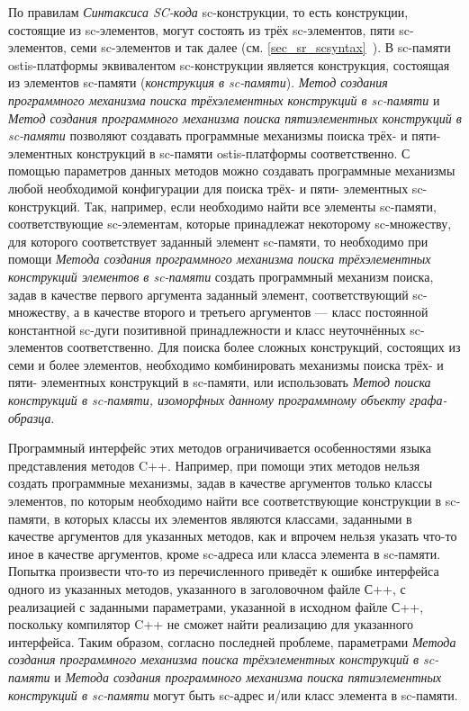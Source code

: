 По правилам \textit{Синтаксиса SC-кода} sc-конструкции, то есть конструкции, состоящие из sc-элементов, могут состоять из трёх sc-элементов, пяти sc-элементов, семи sc-элементов и так далее (см. \ref{sec_sr_scsyntax}~). В sc-памяти ostis-платформы эквивалентом sc-конструкции является конструкция, состоящая из элементов sc-памяти (\textit{конструкция в sc-памяти}). \textit{Метод создания программного механизма поиска трёхэлементных конструкций в sc-памяти} и \textit{Метод создания программного механизма поиска пятиэлементных конструкций в sc-памяти} позволяют создавать программные механизмы поиска трёх- и пяти- элементных конструкций в sc-памяти ostis-платформы соответственно. С помощью параметров данных методов можно создавать программные механизмы любой необходимой конфигурации для поиска трёх- и пяти- элементных sc-конструкций. Так, например, если необходимо найти все элементы sc-памяти, соответствующие sc-элементам, которые принадлежат некоторому sc-множеству, для которого соответствует заданный элемент sc-памяти, то необходимо при помощи \textit{Метода создания программного механизма поиска трёхэлементных конструкций элементов в sc-памяти} создать программный механизм поиска, задав в качестве первого аргумента заданный элемент, соответствующий sc-множеству, а в качестве второго и третьего аргументов --- класс постоянной константной sc-дуги позитивной принадлежности и класс неуточнённых sc-элементов соответственно. Для поиска более сложных конструкций, состоящих из семи и более элементов, необходимо комбинировать механизмы поиска трёх- и пяти- элементных конструкций в sc-памяти, или использовать \textit{Метод поиска конструкций в sc-памяти, изоморфных данному программному объекту графа-образца}.

Программный интерфейс этих методов ограничивается особенностями языка представления методов C++. Например, при помощи этих методов нельзя создать программные механизмы, задав в качестве аргументов только классы элементов, по которым необходимо найти все соответствующие конструкции в sc-памяти, в которых классы их элементов являются классами, заданными в качестве аргументов для указанных методов, как и впрочем нельзя указать что-то иное в качестве аргументов, кроме sc-адреса или класса элемента в sc-памяти. Попытка произвести что-то из перечисленного приведёт к ошибке  интерфейса одного из указанных методов, указанного в заголовочном файле С++, с реализацией с заданными параметрами, указанной в исходном файле С++, поскольку компилятор C++ не сможет найти реализацию для указанного интерфейса. Таким образом, согласно последней проблеме, параметрами \textit{Метода создания программного механизма поиска трёхэлементных конструкций в sc-памяти} и \textit{Метода создания программного механизма поиска пятиэлементных конструкций в sc-памяти} могут быть sc-адрес и/или класс элемента в sc-памяти.

